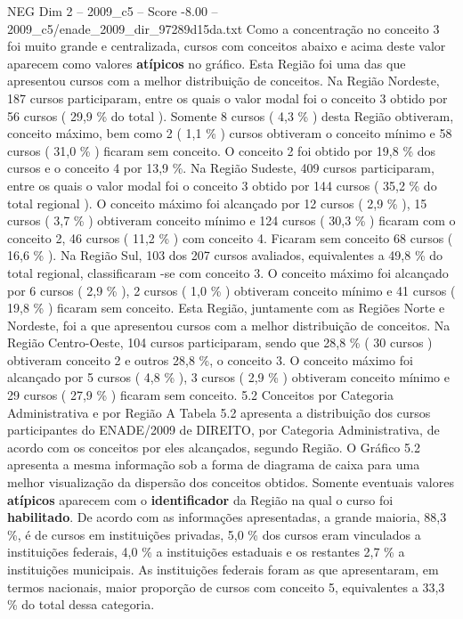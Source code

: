 \begin{textsample}{NEG Dim 2 – 2009\_c5 – Score -8.00 – 2009\_c5/enade\_2009\_dir\_97289d15da.txt}
Como a concentração no conceito 3 foi muito grande e centralizada, cursos com conceitos abaixo e acima deste valor aparecem como valores \textbf{atípicos} no gráfico.
Esta Região foi uma das que apresentou cursos com a melhor distribuição de conceitos.
Na Região Nordeste, 187 cursos participaram, entre os quais o valor modal foi o conceito 3 obtido por 56 cursos ( 29,9 \% do total ).
Somente 8 cursos ( 4,3 \% ) desta Região obtiveram, conceito máximo, bem como 2 ( 1,1 \% ) cursos obtiveram o conceito mínimo e 58 cursos ( 31,0 \% ) ficaram sem conceito.
O conceito 2 foi obtido por 19,8 \% dos cursos e o conceito 4 por 13,9 \%.
Na Região Sudeste, 409 cursos participaram, entre os quais o valor modal foi o conceito 3 obtido por 144 cursos ( 35,2 \% do total regional ).
O conceito máximo foi alcançado por 12 cursos ( 2,9 \% ), 15 cursos ( 3,7 \% ) obtiveram conceito mínimo e 124 cursos ( 30,3 \% ) ficaram com o conceito 2, 46 cursos ( 11,2 \% ) com conceito 4.
Ficaram sem conceito 68 cursos ( 16,6 \% ).
Na Região Sul, 103 dos 207 cursos avaliados, equivalentes a 49,8 \% do total regional, classificaram -se com conceito 3.
O conceito máximo foi alcançado por 6 cursos ( 2,9 \% ), 2 cursos ( 1,0 \% ) obtiveram conceito mínimo e 41 cursos ( 19,8 \% ) ficaram sem conceito.
Esta Região, juntamente com as Regiões Norte e Nordeste, foi a que apresentou cursos com a melhor distribuição de conceitos.
Na Região Centro-Oeste, 104 cursos participaram, sendo que 28,8 \% ( 30 cursos ) obtiveram conceito 2 e outros 28,8 \%, o conceito 3.
O conceito máximo foi alcançado por 5 cursos ( 4,8 \% ), 3 cursos ( 2,9 \% ) obtiveram conceito mínimo e 29 cursos ( 27,9 \% ) ficaram sem conceito. 5.2 Conceitos por Categoria Administrativa e por Região A Tabela 5.2 apresenta a distribuição dos cursos participantes do ENADE/2009 de DIREITO, por Categoria Administrativa, de acordo com os conceitos por eles alcançados, segundo Região.
O Gráfico 5.2 apresenta a mesma informação sob a forma de diagrama de caixa para uma melhor visualização da dispersão dos conceitos obtidos.
Somente eventuais valores \textbf{atípicos} aparecem com o \textbf{identificador} da Região na qual o curso foi \textbf{habilitado}.
De acordo com as informações apresentadas, a grande maioria, 88,3 \%, é de cursos em instituições privadas, 5,0 \% dos cursos eram vinculados a instituições federais, 4,0 \% a instituições estaduais e os restantes 2,7 \% a instituições municipais.
As instituições federais foram as que apresentaram, em termos nacionais, maior proporção de cursos com conceito 5, equivalentes a 33,3 \% do total dessa categoria.

\end{textsample}
